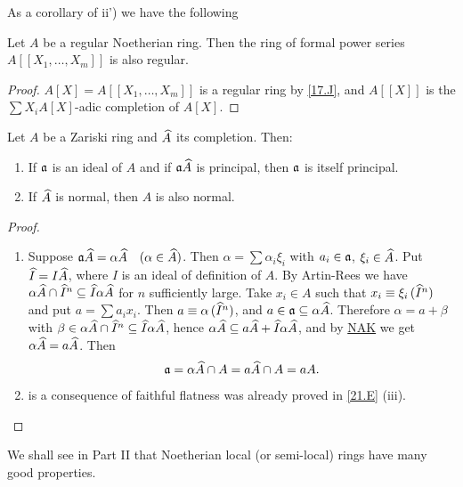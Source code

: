 \documentclass[../main]{subfiles}
\begin{document}
As a corollary of ii') we have the following

\begin{proposition}
Let $A$ be a regular Noetherian ring. Then the ring of formal power series $A[[X_1, \ldots, X_m]]$ is also regular. 
\end{proposition}

\begin{proof}
$A[X] = A[[X_1, \ldots, X_m]]$ is a regular ring by \ref{17.J}, and $A[[X]]$ is the $\sum X_iA[X]$-adic completion of $A[X]$. 
\end{proof}

\begin{parproposition}
Let $A$ be a Zariski ring and $\widehat{A}$ its completion. Then: 

\begin{enumerate}[label=\roman*)]
    \item If $\mathfrak{a}$ is an ideal of $A$ and if $\mathfrak{a} \widehat{A}$ is principal, then $\mathfrak{a}$ is itself principal.
    \item If $\widehat{A}$ is normal, then $A$ is also normal.
\end{enumerate}
\end{parproposition}

\begin{proof}
\begin{enumerate}[label=\roman*)]
    \item Suppose $\ideal {a} \completion A = \alpha \completion A\for{\alpha \in \completion A}$. Then $\alpha = \sum \alpha_i \xi_i$ with $a_i \in \mathfrak{a}$, $\xi_i \in \widehat{A}$. Put $\widehat{I} = I \widehat{A}$, where $I$ is an ideal of definition of $A$. By Artin-Rees we have $\alpha \widehat{A} \cap {\widehat{I}}^n \subseteq \widehat{I} \alpha \widehat{A}$ for $n$ sufficiently large. Take $x_i \in A$ such that $x_i \equiv \xi_i \, ({\widehat{I}}^n)$ and put $a = \sum a_i x_i$. Then $a \equiv \alpha \, ({\widehat{I}}^n)$, and $a \in \mathfrak{a} \subseteq \alpha \widehat{A}$. Therefore $\alpha = a + \beta$ with $\beta \in \alpha \widehat{A} \cap {\widehat{I}}^n \subseteq \widehat{I} \alpha \widehat{A}$, hence $\alpha \widehat{A} \subseteq a \widehat{A} + \widehat{I} \alpha \widehat{A}$, and by \hyperref[NAK]{NAK} we get $\alpha \widehat{A} = a \widehat{A}$. Then \[\mathfrak{a} = \alpha \widehat{A} \cap A = a \widehat{A} \cap A = a A.\]
    \item is a consequence of faithful flatness was already proved in \ref{21.E} (iii).
\end{enumerate}
\end{proof}

We shall see in Part II that Noetherian local (or semi-local) rings have many good properties.
\end{document}
